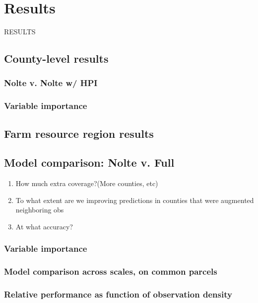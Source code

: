 \documentclass[12pt]{article}
\begin{document}
\newpage

\section{Results}

RESULTS
\subsection{County-level results}
 \subsubsection{Nolte v. Nolte w/ HPI}
 
 \subsubsection{Variable importance}

\subsection{Farm resource region results}

 \subsection{Model comparison: Nolte v. Full}
  \begin{enumerate}
    \item How much extra coverage?(More counties, etc)
    \item To what extent are we improving predictions in counties that were augmented neighboring obs
    \item At what accuracy?
 \end{enumerate}
 
 
 \subsubsection{Variable importance}
 \subsubsection{Model comparison across scales, on common parcels}
 \subsubsection{Relative performance as function of observation density}
\end{document}
